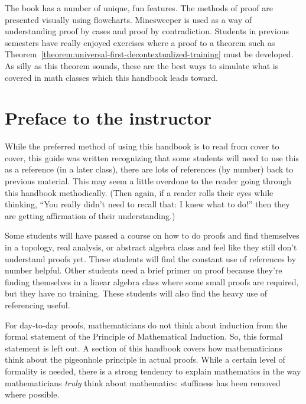 \documentclass{book}
\theoremstyle{ekimcustom}
\begin{document}
The book has a number of unique, fun features. The methods of proof are presented visually using flowcharts. Minesweeper is used as a way of understanding proof by cases and proof by contradiction. Students in previous semesters have really enjoyed exercises where a proof to a theorem such as Theorem~\ref{theorem:universal-first-decontextualized-training} must be developed. As silly as this theorem sounds, these are the best ways to simulate what is covered in math classes which this handbook leads toward. 

\chapter*{Preface to the instructor}

While the preferred method of using this handbook is to read from cover to cover, this guide was written recognizing that some students will need to use this as a reference (in a later class), there are lots of references (by number) back to previous material. This may seem a little overdone to the reader going through this handbook methodically. (Then again, if a reader rolls their eyes while thinking, ``You really didn't need to recall that: I knew what to do!'' then they are getting affirmation of their understanding.)

Some students will have passed a course on how to do proofs and find themselves in a topology, real analysis, or abstract algebra class and feel like they still don't understand proofs yet. These students will find the constant use of references by number helpful. Other students need a brief primer on proof because they're finding themselves in a linear algebra class where some small proofs are required, but they have no training. These students will also find the heavy use of referencing useful.

For day-to-day proofs, mathematicians do not think about induction from the formal statement of the Principle of Mathematical Induction. So, this formal statement is left out. A section of this handbook covers how mathematicians think about the pigeonhole principle in actual proofs. While a certain level of formality is needed, there is a strong tendency to explain mathematics in the way mathematicians \emph{truly} think about mathematics: stuffiness has been removed where possible.

\end{document}
